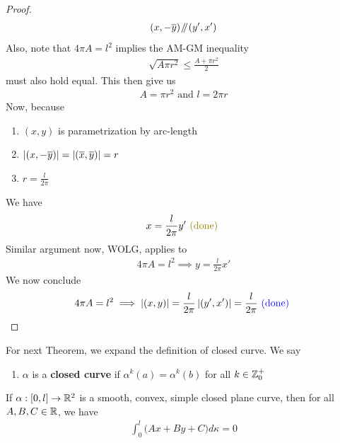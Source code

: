 \documentclass{report}
\begin{document}
\begin{proof}
\begin{align*}
  (x,-\overline{y})\mathbin{\!/\mkern-5mu/\!} (y',x')
\end{align*}
Also, note that $4\pi A=l^2$ implies the AM-GM inequality
\begin{align*}
\sqrt{A\pi r^2}\leq \frac{A+ \pi r^2}{2} 
\end{align*}
must also hold equal. This then give us 
\begin{align*}
A=\pi r^2 \text{ and }l=2\pi r
\end{align*}
Now, because 
\begin{enumerate}[label=(\alph*)]
  \item $(x,y)$ is parametrization by arc-length
  \item $\left|(x,-\overline{y})\right|=\left|(\overline{x},\overline{y})\right|=r$
    \item $r=\frac{l}{2\pi}$
\end{enumerate}
We have 
\begin{align}
  x=\frac{l}{2\pi}y'\odone
\end{align}
Similar argument now, WOLG, applies to 
\begin{align*}
4 \pi A= l^2 \implies y=\frac{l}{2\pi} x'
\end{align*}
We now conclude 
\begin{align*}
4\pi A=l^2 \implies \left|(x,y)\right|=\frac{l}{2\pi}\left|(y',x')\right|=\frac{l}{2\pi}\textcolor{blue}{\text{ (done) }}
\end{align*}

\end{proof}
\begin{mdframed}
For next Theorem, we expand the definition of closed curve. We say 
\begin{enumerate}[label=(\alph*)]
  \item $\alpha $ is a \textbf{closed curve} if $\alpha ^{k}(a)=\alpha ^{k} (b)$ for all $k\in \mathbb{Z}_0^+$
\end{enumerate}
\end{mdframed}
\begin{lemma}
If $\alpha :[0,l]\rightarrow \mathbb{R}^2$ is a smooth, convex, simple closed plane curve, then for all $A,B,C \in\mathbb{R}$, we have 
\begin{align*}
\int_0^l \Big(Ax+By+C \Big)d\kappa =0
\end{align*}
\end{lemma}
\end{document}
